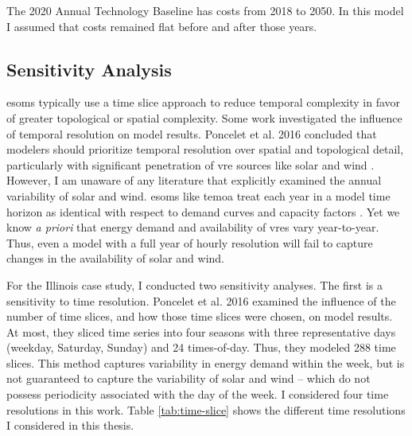 
The 2020 Annual Technology Baseline has costs from 2018 to 2050. In this model
I assumed that costs remained flat before and after those years.

\subsection{Sensitivity Analysis}

\glspl{esom} typically use a time slice approach to reduce temporal complexity
in favor of greater topological or spatial complexity. Some work investigated the
influence of temporal resolution on model results. Poncelet et al. 2016
concluded that modelers should prioritize temporal resolution over spatial and
topological detail, particularly with significant penetration of \gls{vre}
sources like solar and wind \cite{poncelet_impact_2016}. However,
I am unaware of any literature that explicitly examined the annual variability
of solar and wind. \glspl{esom} like \gls{temoa} treat each year in a model
time horizon as identical with respect to demand curves and capacity factors
\cite{hunter_modeling_2013}. Yet
we know \textit{a priori} that energy demand and availability of \glspl{vre}
vary year-to-year. Thus, even a model with a full year of hourly resolution
will fail to capture changes in the availability of solar and wind.

For the Illinois case study, I conducted two sensitivity analyses. The first is a
sensitivity to time resolution. Poncelet et al. 2016 examined the influence of
the number of time slices, and how those time slices were chosen, on model results.
At most, they sliced time series into four seasons with three representative days (weekday,
Saturday, Sunday) and 24 times-of-day. Thus, they modeled 288 time slices. This
method captures variability in energy demand within the week, but is not guaranteed
to capture the variability of solar and wind -- which do not possess periodicity
associated with the day of the week. I considered four time resolutions in this work.
Table \ref{tab:time-slice} shows the different time resolutions I considered in this thesis.

